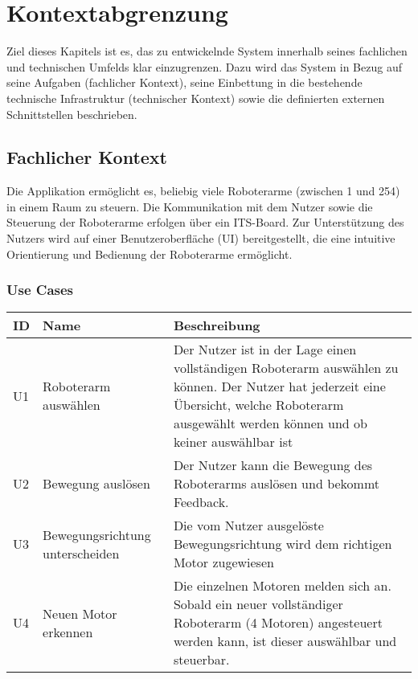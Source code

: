 \chapter{Kontextabgrenzung}
Ziel dieses Kapitels ist es, das zu entwickelnde System innerhalb seines fachlichen und technischen Umfelds klar einzugrenzen. Dazu wird das System in Bezug auf seine Aufgaben (fachlicher Kontext), seine Einbettung in die bestehende technische Infrastruktur (technischer Kontext) sowie die definierten externen Schnittstellen beschrieben.

\section{Fachlicher Kontext}


Die Applikation ermöglicht es, beliebig viele Roboterarme (zwischen 1 und 254) in einem Raum zu steuern. Die Kommunikation mit dem Nutzer sowie die Steuerung der Roboterarme erfolgen über ein ITS-Board. 
Zur Unterstützung des Nutzers wird auf einer Benutzeroberfläche (UI) bereitgestellt, die eine intuitive Orientierung und Bedienung der Roboterarme ermöglicht.

\subsection{Use Cases}
\begin{tabular}{|p{1.5cm}|p{4cm}|p{8.5cm}|}
	\hline
	\textbf{ID} & \textbf{Name} & \textbf{Beschreibung} \\
	\hline
	U1 & Roboterarm auswählen & Der Nutzer ist in der Lage einen vollständigen Roboterarm auswählen zu können. Der Nutzer hat jederzeit eine Übersicht, welche Roboterarm ausgewählt werden können und ob keiner auswählbar ist \\
	\hline
	U2 & Bewegung auslösen & Der Nutzer kann die Bewegung des Roboterarms auslösen und bekommt Feedback. \\
	\hline
	U3 & Bewegungsrichtung unterscheiden & Die vom Nutzer ausgelöste Bewegungsrichtung wird dem richtigen Motor zugewiesen \\
	\hline
	U4 & Neuen Motor erkennen & Die einzelnen Motoren melden sich an. Sobald ein neuer vollständiger Roboterarm (4 Motoren) angesteuert werden kann, ist dieser auswählbar und steuerbar. \\
	\hline
	
	
		
\end{tabular}

